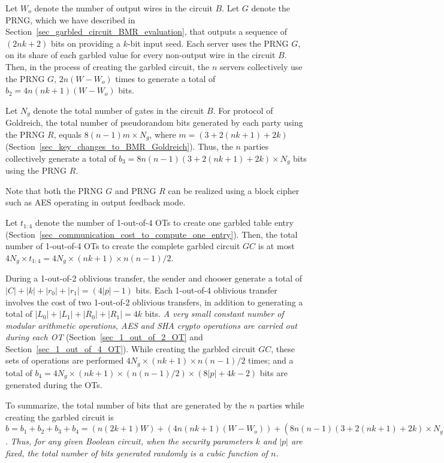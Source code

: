 \documentclass[10pt,journal,cspaper,compsoc]{IEEEtran}
\begin{document}
Let $W_o$ denote the number of output wires in the circuit $B$. Let $G$ denote the PRNG, which we have described in Section~\ref{sec_garbled_circuit_BMR_evaluation}, that outputs a sequence of $(2nk+2)$ bits on providing a $k$-bit input seed. Each server uses the PRNG $G$, on its share of each garbled value for every non-output wire in the circuit $B$. Then, in the process of creating the garbled circuit, the $n$ servers collectively use the PRNG $G$, $2n(W-W_o)$ times to generate a total of $b_{2}=4n(nk+1)(W-W_o)$ bits.


Let $N_g$ denote the total number of gates in the circuit $B$. For protocol of Goldreich, the total number of pseudorandom bits generated by each party using the PRNG $R$, equals $8(n-1)m\times N_g$, where $m=(3+2(nk+1)+2k)$ (Section~\ref{sec_key_changes_to_BMR_Goldreich}). Thus, the $n$ parties collectively generate a total of $b_{3}=8n(n-1)(3+2(nk+1)+2k)\times N_g$ bits using the PRNG $R$.


Note that both the PRNG $G$ and PRNG $R$ can be realized using a block cipher such as AES operating in output feedback mode.


Let $t_{1:4}$ denote the number of 1-out-of-4 OTs to create one garbled table entry (Section~\ref{sec_communication_cost_to_compute_one_entry}). Then, the total number of 1-out-of-4 OTs to create the complete garbled circuit $GC$ is at most $4N_g\times t_{1:4}=4N_g\times (nk+1)\times n(n-1)/2$.


During a 1-out-of-2 oblivious transfer, the sender and chooser generate a total of $|C|+|k|+|r_0|+|r_1|=(4|p|-1)$ bits. Each 1-out-of-4 oblivious transfer involves the cost of two 1-out-of-2 oblivious transfers, in addition to generating a total of $|L_0|+|L_1|+|R_0|+|R_1|=4k$ bits. {\em A very small constant number of modular arithmetic operations, AES and SHA crypto operations are carried out during each OT} (Section~\ref{sec_1_out_of_2_OT} and Section~\ref{sec_1_out_of_4_OT}). While creating the garbled circuit $GC$, these sets of operations are performed $4N_g\times (nk+1)\times n(n-1)/2$ times; and a total of $b_{4}=4N_g\times (nk+1)\times (n(n-1)/2)\times (8|p|+4k-2)$ bits are generated during the OTs.







To summarize, the total number of bits that are generated by the $n$ parties while creating the garbled circuit is $b=b_1+b_2+b_3+b_4=(n(2k+1)W)+(4n(nk+1)(W-W_o))+(8n(n-1)(3+2(nk+1)+2k)\times N_g)+(4N_g\times (nk+1)\times (n(n-1)/2)\times (8|p|+4k-2))$. {\em Thus, for any given Boolean circuit, when the security parameters $k$ and $|p|$ are fixed, the total number of bits generated randomly is a cubic function of $n$.}
\end{document}
